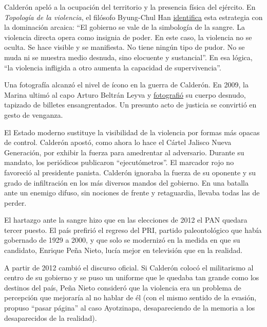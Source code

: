 Calderón apeló a la ocupación del territorio y la presencia física del
ejército. En \emph{Topología de la violencia}, el filósofo Byung-Chul
Han
\href{https://books.google.com.mx/books?id=8AOIDwAAQBAJ\&pg=PT7\&lpg=PT7\&dq=El+gobierno+se+vale+de+la+simbolog\%C3\%ADa+de+la+sangre.+La+violencia+directa+opera+como+insignia+de+poder.+En+este+caso,+la+violencia+no+se+oculta.\&source=bl\&ots=1cVn6vn2vs\&sig=ACfU3U3f-3zydv-yjYqwRF6UUJE4avD9dA\&hl=es-419\&sa=X\&ved=2ahUKEwjCyMaf5vPqAhVN-qwKHf5QB4UQ6AEwAHoECAoQAQ\#v=onepage\&q\&f=false}{identifica}
esta estrategia con la dominación arcaica: ``El gobierno se vale de la
simbología de la sangre. La violencia directa opera como insignia de
poder. En este caso, la violencia no se oculta. Se hace visible y se
manifiesta. No tiene ningún tipo de pudor. No se muda ni se muestra
medio desnuda, sino elocuente y sustancial''. En esa lógica, ``la
violencia infligida a otro aumenta la capacidad de supervivencia''.

Una fotografía alcanzó el nivel de ícono en la guerra de Calderón. En
2009, la Marina ultimó al capo Arturo Beltrán Leyva y
\href{https://www.elmundo.es/america/2009/12/18/mexico/1261156208.html}{fotografió}
su cuerpo desnudo, tapizado de billetes ensangrentados. Un presunto acto
de justicia se convirtió en gesto de venganza.

El Estado moderno sustituye la visibilidad de la violencia por formas
más opacas de control. Calderón apostó, como ahora lo hace el Cártel
Jalisco Nueva Generación, por exhibir la fuerza para amedrentar al
adversario. Durante su mandato, los periódicos publicaron
``ejecutómetros''. El marcador rojo no favoreció al presidente panista.
Calderón ignoraba la fuerza de su oponente y su grado de infiltración en
los más diversos mandos del gobierno. En una batalla ante un enemigo
difuso, sin nociones de frente y retaguardia, llevaba todas las de
perder.

El hartazgo ante la sangre hizo que en las elecciones de 2012 el PAN
quedara tercer puesto. El país prefirió el regreso del PRI, partido
paleontológico que había gobernado de 1929 a 2000, y que solo se
modernizó en la medida en que su candidato, Enrique Peña Nieto, lucía
mejor en televisión que en la realidad.

A partir de 2012 cambió el discurso oficial. Si Calderón colocó el
militarismo al centro de su gobierno y se puso un uniforme que le
quedaba tan grande como los destinos del país, Peña Nieto consideró que
la violencia era un problema de percepción que mejoraría al no hablar de
él (con el mismo sentido de la evasión, propuso ``pasar página'' al caso
Ayotzinapa, desapareciendo de la memoria a los desaparecidos de la
realidad).

